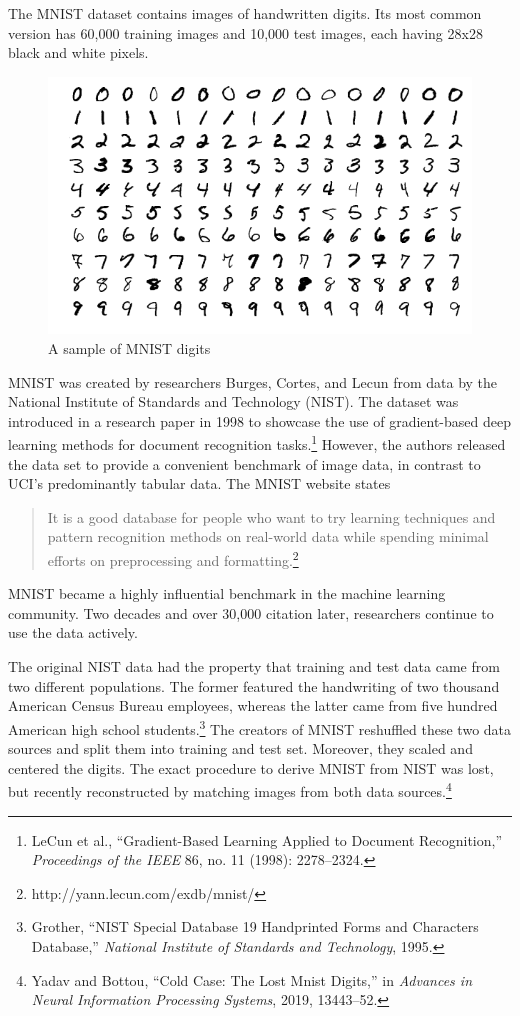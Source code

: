 \documentclass{tufte-book}
\begin{document}
The MNIST dataset contains images of handwritten digits. Its most common
version has 60,000 training images and 10,000 test images, each having
28x28 black and white pixels.

\begin{figure}
\centering
\includegraphics{assets/datasets_mnist-examples.png}
\caption{A sample of MNIST digits}
\end{figure}

MNIST was created by researchers Burges, Cortes, and Lecun from data by
the National Institute of Standards and Technology (NIST). The dataset
was introduced in a research paper in 1998 to showcase the use of
gradient-based deep learning methods for document recognition
tasks.\footnote{LeCun et al., {``Gradient-Based Learning Applied to
  Document Recognition,''} \emph{Proceedings of the IEEE} 86, no. 11
  (1998): 2278--2324.} However, the authors released the data set to
provide a convenient benchmark of image data, in contrast to UCI's
predominantly tabular data. The MNIST website states

\begin{quote}
It is a good database for people who want to try learning techniques and
pattern recognition methods on real-world data while spending minimal
efforts on preprocessing and formatting.\footnote{http://yann.lecun.com/exdb/mnist/}
\end{quote}

MNIST became a highly influential benchmark in the machine learning
community. Two decades and over 30,000 citation later, researchers
continue to use the data actively.

The original NIST data had the property that training and test data came
from two different populations. The former featured the handwriting of
two thousand American Census Bureau employees, whereas the latter came
from five hundred American high school students.\footnote{Grother,
  {``NIST Special Database 19 Handprinted Forms and Characters
  Database,''} \emph{National Institute of Standards and Technology},
  1995.} The creators of MNIST reshuffled these two data sources and
split them into training and test set. Moreover, they scaled and
centered the digits. The exact procedure to derive MNIST from NIST was
lost, but recently reconstructed by matching images from both data
sources.\footnote{Yadav and Bottou, {``Cold Case: The Lost Mnist
  Digits,''} in \emph{Advances in Neural Information Processing
  Systems}, 2019, 13443--52.}
\end{document}
